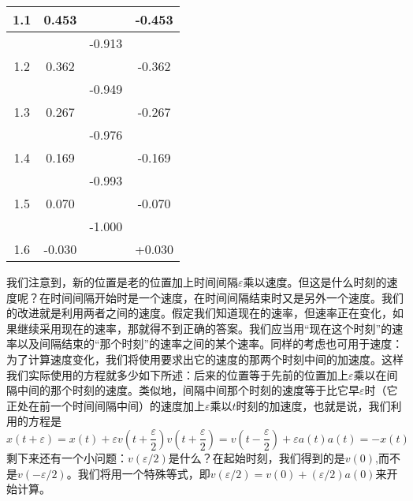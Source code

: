 \begin{table}[H]
{\begin{tabular}{|c|c|c|c|}
        1.1 & 0.453 & ~ & -0.453 \\ \hline
        ~ & ~ & -0.913 & ~ \\ \hline
        1.2 & 0.362 & ~ & -0.362 \\ \hline
        ~ & ~ & -0.949 & ~ \\ \hline
        1.3 & 0.267 & ~ & -0.267 \\ \hline
        ~ & ~ & -0.976 & ~ \\ \hline
        1.4 & 0.169 & ~ & -0.169 \\ \hline
        ~ & ~ & -0.993 & ~ \\ \hline
        1.5 & 0.070 & ~ & -0.070 \\ \hline
        ~ & ~ & -1.000 & ~ \\ \hline
        1.6 & -0.030 & ~ & +0.030 \\ \hline
    \end{tabular}
    }
\end{table}

我们注意到，新的位置是老的位置加上时间间隔$\varepsilon $乘以速度。但这是什么时刻的速度呢？在时间间隔开始时是一个速度，在时间间隔结束时又是另外一个速度。我们的改进就是利用两者之间的速度。假定我们知道现在的速率，但速率正在变化，如果继续采用现在的速率，那就得不到正确的答案。我们应当用“现在这个时刻”的速率以及间隔结束的“那个时刻”的速率之间的某个速率。同样的考虑也可用于速度：为了计算速度变化，我们将使用要求出它的速度的那两个时刻中间的加速度。这样我们实际使用的方程就多少如下所述：后来的位置等于先前的位置加上$\varepsilon $乘以在间隔中间的那个时刻的速度。类似地，间隔中间那个时刻的速度等于比它早$\varepsilon $时（它正处在前一个时间间隔中间）的速度加上$\varepsilon $乘以$t$时刻的加速度，也就是说，我们利用的方程是
\begin{equation}
    \label{Eq:I:9:16}
    x(t+\varepsilon )=x(t)+\varepsilon v(t+\frac{\varepsilon}{2})
    v(t+\frac{\varepsilon}{2})=v(t-\frac{\varepsilon}{2})+\varepsilon a(t)
    a(t)=-x(t)
\end{equation}
剩下来还有一个小问题：$v(\varepsilon/2)$是什么？在起始时刻，我们得到的是$v(0)$,而不是$v(-\varepsilon/2)$。我们将用一个特殊等式，即$v(\varepsilon/2)=v(0)+(\varepsilon/2)a(0)$来开始计算。

